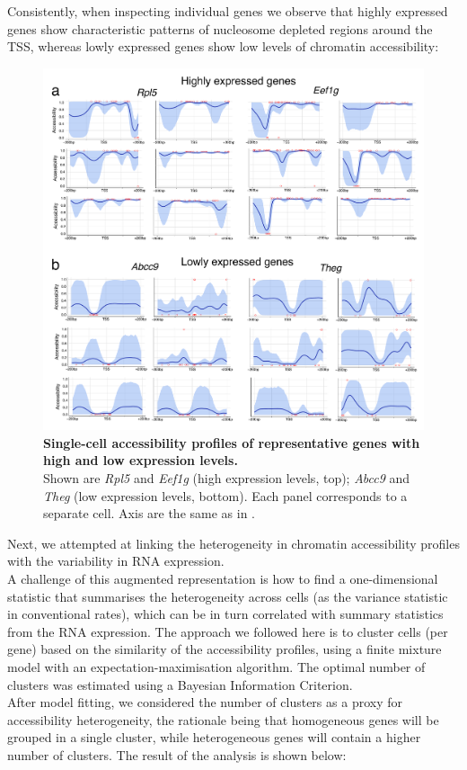 Consistently, when inspecting individual genes we observe that highly expressed genes show characteristic patterns of nucleosome depleted regions around the TSS, whereas lowly expressed genes show low levels of chromatin accessibility:

\begin{figure}[H]
	\centering
	\includegraphics[width=0.9\linewidth]{scNMT_profiles_expr}
	\caption[]{\textbf{Single-cell accessibility profiles of representative genes with high and low expression levels.}\\
	Shown are \textit{Rpl5} and \textit{Eef1g} (high expression levels, top); \textit{Abcc9} and \textit{Theg} (low expression levels, bottom). Each panel corresponds to a separate cell. Axis are the same as in . }
	\label{fig:scnmt_profiles_highexpr}
\end{figure}

Next, we attempted at linking the heterogeneity in chromatin accessibility profiles with the variability in RNA expression.\\
A challenge of this augmented representation is how to find a one-dimensional statistic that summarises the heterogeneity across cells (as the variance statistic in conventional rates), which can be in turn correlated with summary statistics from the RNA expression. The approach we followed here is to cluster cells (per gene) based on the similarity of the accessibility profiles, using a finite mixture model with an expectation-maximisation algorithm. The optimal number of clusters was estimated using a Bayesian Information Criterion.\\
After model fitting, we considered the number of clusters as a proxy for accessibility heterogeneity, the rationale being that homogeneous genes will be grouped in a single cluster, while heterogeneous genes will contain a higher number of clusters. The result of the analysis is shown below:\\


